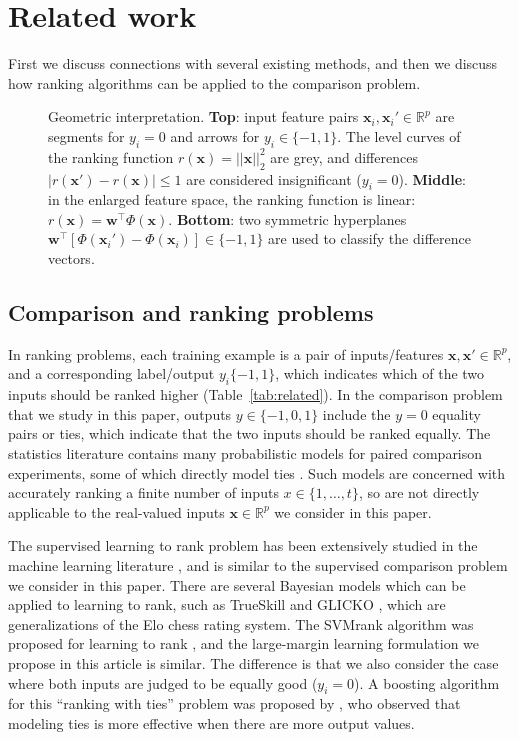\documentclass[twoside,11pt]{article}
\newcommand{\RR}{\mathbb R}
\begin{document}
\section{Related work}
\label{sec:related}

First we discuss connections with several existing methods, and then
we discuss how ranking algorithms can be applied to the comparison
problem.


\begin{figure}
  \centering
  
  \vskip -0.5cm
  \caption{Geometric interpretation. \textbf{Top}: input feature pairs
    $\mathbf x_i,\mathbf x_i'\in\RR^p$ are segments for $y_i=0$ and
    arrows for $y_i\in\{-1,1\}$. The level curves of the ranking
    function $r(\mathbf x)=||\mathbf x||_2^2$ are grey, and
    differences $|r(\mathbf x')-r(\mathbf x)|\leq 1$ are considered
    insignificant ($y_i=0$). \textbf{Middle}: in the enlarged feature
    space, the ranking function is linear: $r(\mathbf x)=\mathbf
    w^\intercal \Phi(\mathbf x)$. \textbf{Bottom}: two symmetric
    hyperplanes $\mathbf w^\intercal[\Phi(\mathbf x_i')-\Phi(\mathbf
    x_i)]\in\{-1,1\}$ are used to classify the difference vectors.}
  \label{fig:norm-data}
\end{figure}

\subsection{Comparison and ranking problems}

In ranking problems, each training example is a pair of
inputs/features $\mathbf x,\mathbf x'\in\RR^p$, and a corresponding
label/output $y_i\{-1,1\}$, which indicates which of the two inputs
should be ranked higher (Table~\ref{tab:related}). In the comparison
problem that we study in this paper, outputs $y\in\{-1,0,1\}$ include
the $y=0$ equality pairs or ties, which indicate that the two inputs
should be ranked equally.  The statistics literature contains many
probabilistic models for paired comparison experiments, some of which
directly model ties \citep{davidson-ties}. Such models are concerned
with accurately ranking a finite number of inputs $x\in\{1,\dots,t\}$,
so are not directly applicable to the real-valued inputs
$\mathbf x\in\RR^p$ we consider in this paper. 

The supervised learning to rank problem has been extensively studied
in the machine learning literature \citep{object-ranking-methods,
  learning-to-rank}, and is similar to the supervised comparison
problem we consider in this paper. There are several Bayesian models
which can be applied to learning to rank, such as TrueSkill
\citep{trueskill} and GLICKO \citep{GLICKO}, which are generalizations
of the Elo chess rating system. The SVMrank algorithm was
proposed for learning to rank \citep{ranksvm}, and the large-margin
learning formulation we propose in this article is similar. The
difference is that we also consider the case where both inputs are
judged to be equally good ($y_i=0$). A boosting algorithm for this
``ranking with ties'' problem was proposed by \citet{rank-with-ties},
who observed that modeling ties is more effective when there are more
output values.
\end{document}
